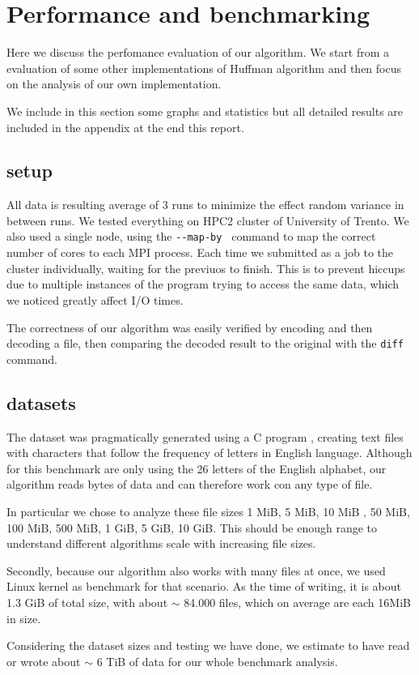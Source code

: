 \section{Performance and benchmarking}
Here we discuss the perfomance evaluation of our algorithm.
We start from a evaluation of some other implementations of Huffman algorithm and then focus on the analysis of our own implementation. 

We include in this section some graphs and statistics but all detailed results are included in the appendix at the end this report.
\subsection{setup}
All data is resulting average of 3 runs to minimize the effect random variance in between runs.
We tested everything on HPC2 cluster of University of Trento.
We also used a single node, using the \verb|--map-by | command to map the correct number of cores to each MPI process.
Each time we submitted as a job to the cluster individually, waiting for the previuos to finish. This is to prevent hiccups due to multiple instances of the program trying to access the same data, which we noticed greatly affect I/O times.

The correctness of our algorithm was easily verified by encoding and then decoding a file, then comparing the decoded result to the original with the \verb|diff| command.
\subsection{datasets}
The dataset was pragmatically generated using a C program , creating text files with characters that follow the frequency of letters in English language. Although for this benchmark are only using the 26 letters of the English alphabet, our algorithm reads bytes of data and can therefore work con any type of file.

In particular we chose to analyze these file sizes 1 MiB, 5 MiB, 10 MiB , 50 MiB, 100 MiB, 500 MiB, 1 GiB, 5 GiB, 10 GiB. This should be enough range to understand different algorithms scale with increasing file sizes.

Secondly, because our algorithm also works with many files at once, we used Linux kernel as benchmark for that scenario. As the time of writing, it is about 1.3 GiB of total size, with about  $\sim$ 84.000 files, which on average are each 16MiB in size.

Considering the dataset sizes and testing we have done, we estimate to have read or wrote about $\sim$ 6 TiB of data for our whole benchmark analysis.
